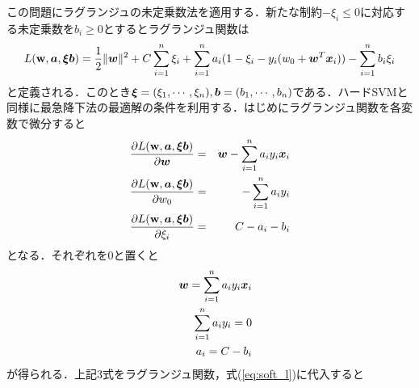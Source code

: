 \documentclass[a4j]{jsarticle}
\def\vec#1{\mbox{\boldmath $#1$}}
\begin{document}
この問題にラグランジュの未定乗数法を適用する．新たな制約$-\xi_i\le 0$に対応する未定乗数を$b_i \ge 0$とするとラグランジュ関数は
\begin{eqnarray}
	\label{eq:soft_l}
	L(\vec{\rm w},\vec a,\vec \xi \vec b) = \frac{1}{2}\|\vec w\|^2 +C\sum^{n}_{i=1}\xi_i + \sum^{n}_{i=1}a_i(1-\xi_i-y_i(w_0+\vec{w}^T\vec{x}_i))-\sum^{n}_{i=1}b_i\xi_i
\end{eqnarray}
と定義される．このとき$\vec \xi=(\xi_1,\cdots,\xi_n),\vec b = (b_1,\cdots,b_n)$である．ハードSVMと同様に最急降下法の最適解の条件を利用する．はじめにラグランジュ関数を各変数で微分すると
\begin{eqnarray}
	\frac{\partial L(\vec{\rm w},\vec a,\vec \xi \vec b)}{\partial \vec w}&=& \vec{w}-\sum^{n}_{i=1}a_iy_i\vec{x}_i \\
	\frac{\partial L(\vec{\rm w},\vec a,\vec \xi \vec b)}{\partial w_0}&=& -\sum^{n}_{i=1}a_iy_i \\
	\frac{\partial L(\vec{\rm w},\vec a,\vec \xi \vec b)}{\partial \xi_i} &=& C-a_i-b_i
\end{eqnarray}
となる．それぞれを0と置くと
\begin{eqnarray}
	\label{eq:soft_soutui1}
	&&\vec w = \sum^{n}_{i=1}a_iy_i\vec{x}_i \\
	\label{eq:soft_soutui2}
	&&\sum^{n}_{i=1}a_iy_i=0 \\
	\label{eq:soft_soutui3}
	&&a_i = C-b_i
\end{eqnarray}
が得られる．上記3式をラグランジュ関数，式(\ref{eq:soft_l})に代入すると
\end{document}
